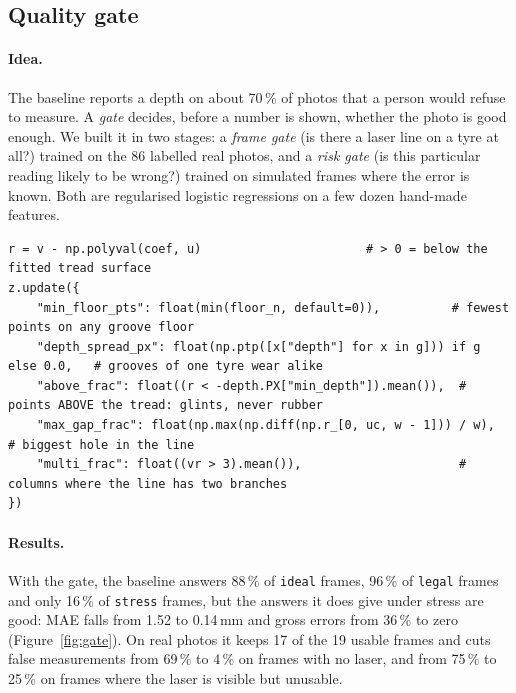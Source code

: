 

\subsection{Quality gate}\label{sec:gate}

\paragraph{Idea.} The baseline reports a depth on about 70\,\% of photos that a person would refuse to measure. A
\emph{gate} decides, before a number is shown, whether the photo is good enough. We built it in two stages: a
\emph{frame gate} (is there a laser line on a tyre at all?) trained on the 86 labelled real photos, and a \emph{risk
gate} (is this particular reading likely to be wrong?) trained on simulated frames where the error is known.
Both are regularised logistic regressions on a few dozen hand-made features.

\begin{lstlisting}[caption={Some of the risk-gate features (\texttt{algos/gate\_features.py}). Each is a number a technician could also judge by eye.}]
r = v - np.polyval(coef, u)                       # > 0 = below the fitted tread surface
z.update({
    "min_floor_pts": float(min(floor_n, default=0)),          # fewest points on any groove floor
    "depth_spread_px": float(np.ptp([x["depth"] for x in g])) if g else 0.0,   # grooves of one tyre wear alike
    "above_frac": float((r < -depth.PX["min_depth"]).mean()),  # points ABOVE the tread: glints, never rubber
    "max_gap_frac": float(np.max(np.diff(np.r_[0, uc, w - 1])) / w),           # biggest hole in the line
    "multi_frac": float((vr > 3).mean()),                      # columns where the line has two branches
})
\end{lstlisting}

\paragraph{Results.} With the gate, the baseline answers 88\,\% of \texttt{ideal} frames, 96\,\% of \texttt{legal}
frames and only 16\,\% of \texttt{stress} frames, but the answers it does give under stress are good: MAE falls from
1.52 to 0.14\,mm and gross errors from 36\,\% to zero (Figure~\ref{fig:gate}). On real photos it keeps 17 of the 19
usable frames and cuts false measurements from 69\,\% to 4\,\% on frames with no laser, and from 75\,\% to 25\,\% on
frames where the laser is visible but unusable.

